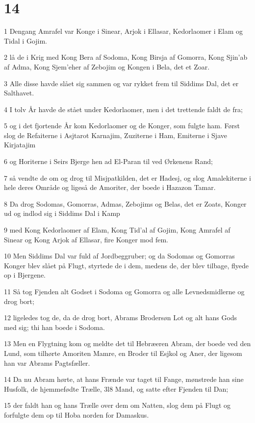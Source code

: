 \chapter{14}

\par 1 Dengang Amrafel var Konge i Sinear, Arjok i Ellasar, Kedorlaomer i Elam og Tidal i Gojim.
\par 2 lå de i Krig med Kong Bera af Sodoma, Kong Birsja af Gomorra, Kong Sjin'ab af Adma, Kong Sjem'eher af Zebojim og Kongen i Bela, det et Zoar.
\par 3 Alle disse havde slået sig sammen og var rykket frem til Siddims Dal, det er Salthavet.
\par 4 I tolv År havde de stået under Kedorlaomer, men i det trettende faldt de fra;
\par 5 og i det fjortende År kom Kedorlaomer og de Konger, som fulgte ham. Først slog de Refaiterne i Asjtarot Karnajim, Zuziterne i Ham, Emiterne i Sjave Kirjatajim
\par 6 og Horiterne i Seirs Bjerge hen ad El-Paran til ved Ørkenens Rand;
\par 7 så vendte de om og drog til Misjpatkilden, det er Hadesj, og slog Amalekiterne i hele deres Område og ligeså de Amoriter, der boede i Hazazon Tamar.
\par 8 Da drog Sodomas, Gomorras, Admas, Zebojims og Belas, det er Zoats, Konger ud og indlod sig i Siddims Dal i Kamp
\par 9 med Kong Kedorlaomer af Elam, Kong Tid'al af Gojim, Kong Amrafel af Sinear og Kong Arjok af Ellasar, fire Konger mod fem.
\par 10 Men Siddims Dal var fuld af Jordbeggruber; og da Sodomas og Gomorras Konger blev slået på Flugt, styrtede de i dem, medens de, der blev tilbage, flyede op i Bjergene.
\par 11 Så tog Fjenden alt Godset i Sodoma og Gomorra og alle Levnedsmidlerne og drog bort;
\par 12 ligeledes tog de, da de drog bort, Abrams Brodersøn Lot og alt hans Gods med sig; thi han boede i Sodoma.
\par 13 Men en Flygtning kom og meldte det til Hebræeren Abram, der boede ved den Lund, som tilhørte Amoriten Mamre, en Broder til Esjkol og Aner, der ligesom han var Abrams Pagtsfæller.
\par 14 Da nu Abram hørte, at hans Frænde var taget til Fange, mønstrede han sine Husfolk, de hjemmefødte Trælle, 3l8 Mand, og satte efter Fjenden til Dan;
\par 15 der faldt han og hans Trælle over dem om Natten, slog dem på Flugt og forfulgte dem op til Hoba norden for Damaskus.
